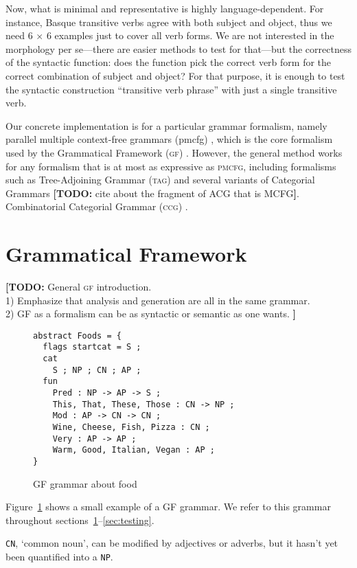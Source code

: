 \documentclass[runningheads]{llncs}
\def\t#1{\texttt{#1}}
\def\gf{\textsc{gf}}
\def\ccg{\textsc{ccg}}
\def\tag{\textsc{tag}}
\def\pmcfg{\textsc{pmcfg}}
\newcommand{\todo}[1]{{\color{cyan}\textbf{[TODO: }#1\textbf{]}}}
\begin{document}
Now, what is minimal and representative is highly language-dependent. 
For instance, Basque transitive verbs agree with both subject and
object, thus we need 6 $\times$ 6 examples just to cover all verb
forms. We are not interested in the morphology per se---there are
easier methods to test for that---but the correctness of the syntactic
function: does the function pick the correct verb form for the correct
combination of subject and object? For that purpose, it is enough to
test the syntactic construction ``transitive verb phrase'' with just a
single transitive verb.

Our concrete implementation is for a particular grammar formalism,
namely parallel multiple context-free grammars ({\sc pmcfg})
\cite{seki91pmcfg}, which is the core formalism used by the
Grammatical Framework (\gf) \cite{ranta2004gf}. However, the general
method works for any formalism that is at most as expressive as
\pmcfg{}, including formalisms such as Tree-Adjoining Grammar (\tag)
\cite{joshi1975tag} and several variants of Categorial Grammars
\todo{cite about the fragment of ACG that is MCFG}.
Combinatorial Categorial Grammar (\ccg) \cite{steedman1988ccg}.

\section{Grammatical Framework}
\label{sec:GF}

\todo{General \gf{} introduction.\\
1) Emphasize that analysis and generation are all in the same
  grammar. \\ 2) GF as a formalism can be as syntactic or semantic as one wants.
}

\begin{figure}[h]
  \caption{GF grammar about food}
\label{fig:exampleGrammar}
\centering
    \begin{verbatim}
abstract Foods = {
  flags startcat = S ;
  cat
    S ; NP ; CN ; AP ;
  fun
    Pred : NP -> AP -> S ;
    This, That, These, Those : CN -> NP ;
    Mod : AP -> CN -> CN ;
    Wine, Cheese, Fish, Pizza : CN ;
    Very : AP -> AP ;
    Warm, Good, Italian, Vegan : AP ;
}
    \end{verbatim}
\end{figure}

Figure~\ref{fig:exampleGrammar} shows a small example of a GF
grammar. We refer to this grammar throughout sections~\ref{sec:GF}--\ref{sec:testing}. 

\t{CN}, `common noun', can be modified by adjectives or adverbs, but
it hasn't yet been quantified into a \t{NP}. 
\end{document}
